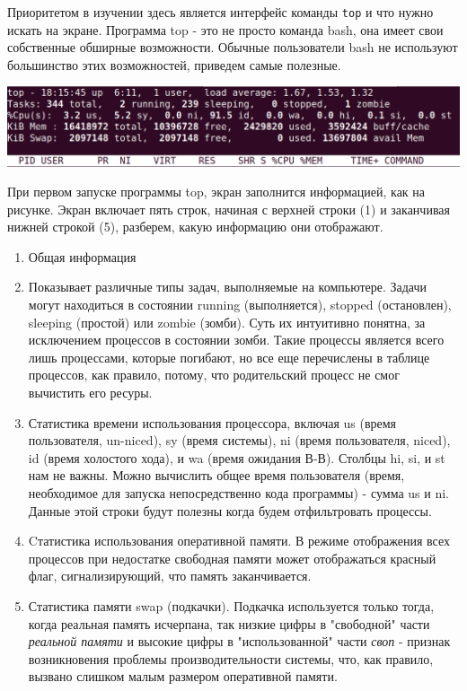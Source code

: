\documentclass{article}
\begin{document}
Приоритетом в изучении здесь является интерфейс команды \texttt{top} и
что нужно искать на экране. Программа top - это не просто команда bash,
она имеет свои собственные обширные возможности. Обычные пользователи
bash не используют большинство этих возможностей, приведем самые
полезные.

\includegraphics{blog/2019/bash-essentials/top-header.png}

При первом запуске программы top, экран заполнится информацией, как на
рисунке. Экран включает пять строк, начиная с верхней строки (1) и
заканчивая нижней строкой (5), разберем, какую информацию они
отображают.

\begin{enumerate}
\tightlist
\item
  Общая информация
\item
  Показывает различные типы задач, выполняемые на компьютере. Задачи
  могут находиться в состоянии running (выполняется), stopped
  (остановлен), sleeping (простой) или zombie (зомби). Суть их
  интуитивно понятна, за исключением процессов в состоянии зомби. Такие
  процессы является всего лишь процессами, которые погибают, но все еще
  перечислены в таблице процессов, как правило, потому, что родительский
  процесс не смог вычистить его ресуры.
\item
  Статистика времени использования процессора, включая us (время
  пользователя, un-niced), sy (время системы), ni (время пользователя,
  niced), id (время холостого хода), и wa (время ожидания В-В). Столбцы
  hi, si, и st нам не важны. Можно вычислить общее время пользователя
  (время, необходимое для запуска непосредственно кода программы) -
  сумма us и ni. Данные этой строки будут полезны когда будем
  отфильтровать процессы.
\item
  Cтатистика использования оперативной памяти. В режиме отображения всех
  процессов при недостатке свободная памяти может отображаться красный
  флаг, сигнализирующий, что память заканчивается.
\item
  Статистика памяти swap (подкачки). Подкачка используется только тогда,
  когда реальная память исчерпана, так низкие цифры в "свободной" части
  \emph{реальной памяти} и высокие цифры в "использованной" части
  \emph{своп} - признак возникновения проблемы производительности
  системы, что, как правило, вызвано слишком малым размером оперативной
  памяти.
\end{enumerate}
\end{document}
